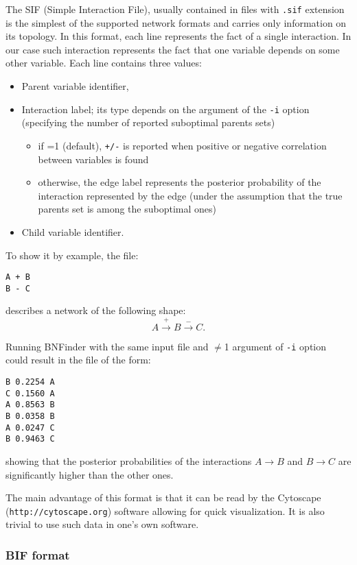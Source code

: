 The SIF (Simple Interaction File), usually contained in files with
\texttt{.sif} extension is the simplest of the supported network formats 
and carries only information on its topology. In this
format, each line represents the fact of a single interaction. In our
case such interaction represents the fact that one variable depends on
some other variable. Each line contains three values:
\begin{itemize}
\item Parent variable identifier,
\item Interaction label; its type depends on the argument of the \texttt{-i}
 option (specifying the number of reported suboptimal parents sets)
  \begin{itemize}
  \item if =1 (default), \texttt{+/-} is reported when
  positive or negative correlation between variables is found
  \item otherwise, the edge label represents the posterior probability 
  of the interaction represented by the edge 
  (under the assumption that the true parents set is among the suboptimal ones)
  \end{itemize}
\item Child variable identifier.
\end{itemize}

To show it by example, the file:
\begin{verbatim}
A + B
B - C
\end{verbatim}
describes a network of the following shape:
$$ A \xrightarrow{+} B \xrightarrow{-} C.$$

Running BNFinder with the same input file and $\neq$1 argument 
of \texttt{-i} option could result in the file of the form:
\begin{verbatim}
B 0.2254 A
C 0.1560 A
A 0.8563 B
B 0.0358 B
A 0.0247 C
B 0.9463 C
\end{verbatim}
showing that the posterior probabilities of the interactions 
$ A \rightarrow B $ and $ B \rightarrow C $ are significantly 
higher than the other ones.

The main advantage of this format is that it can be read by the
Cytoscape (\texttt{http://cytoscape.org}) software allowing for quick
visualization. It is also trivial to use such data in one's own
software.  

\subsubsection{BIF format} 


